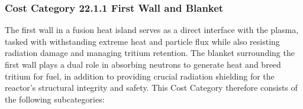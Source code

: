 
\subsubsection*{Cost Category 22.1.1 First Wall and Blanket}
\label{section:22.1.1}

The first wall in a fusion heat island serves as a direct interface with the plasma, tasked with withstanding extreme heat and particle flux while also resisting radiation damage and managing tritium retention. The blanket surrounding the first wall plays a dual role in absorbing neutrons to generate heat and breed tritium for fuel, in addition to providing crucial radiation shielding for the reactor's structural integrity and safety.  This Cost Category therefore consists of the following subcategories:



